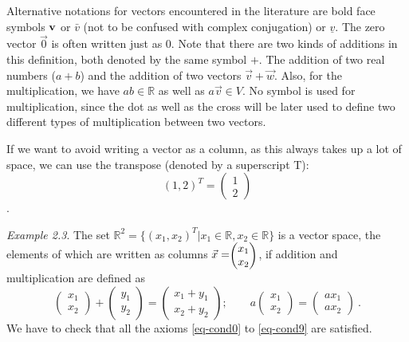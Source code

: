 \documentclass[
  letterpaper,
  DIV=11,
  numbers=noendperiod]{scrartcl}
\theoremstyle{remark}
\begin{document}
\begin{tcolorbox}[enhanced jigsaw, title=\textcolor{quarto-callout-note-color}{\faInfo}\hspace{0.5em}{Remark on Notation}, colframe=quarto-callout-note-color-frame, colbacktitle=quarto-callout-note-color!10!white, opacityback=0, bottomtitle=1mm, arc=.35mm, toptitle=1mm, colback=white, titlerule=0mm, bottomrule=.15mm, left=2mm, rightrule=.15mm, coltitle=black, toprule=.15mm, breakable, opacitybacktitle=0.6, leftrule=.75mm]

Alternative notations for vectors encountered in the literature are bold
face symbols \({\bf v}\) or \(\bar v\) (not to be confused with complex
conjugation) or \(\underline v\). The zero vector \(\vec{0}\) is often
written just as \(0\). Note that there are two kinds of additions in
this definition, both denoted by the same symbol \(+\). The addition of
two real numbers (\(a+b\)) and the addition of two vectors
\(\vec{v}+\vec{w}\). Also, for the multiplication, we have
\(ab \in \mathbb{R}\) as well as \(a \vec{v} \in V\). No symbol is used
for multiplication, since the dot as well as the cross will be later
used to define two different types of multiplication between two
vectors.

If we want to avoid writing a vector as a column, as this always takes
up a lot of space, we can use the transpose (denoted by a superscript
T): \[ (1,2)^T = \begin{pmatrix}  1 \\ 2 \end{pmatrix} \].

\end{tcolorbox}

\emph{Example 2.3}. The set
\(\mathbb{R}^2 = \{(x_{1},x_{2})^T \vert x_{1} \in \mathbb{R}, x_{2} \in \mathbb{R}\}\)
is a vector space, the elements of which are written as columns
\(\vec{x}=\scriptstyle \begin{pmatrix}   x_{1}\\x_{2}  \end{pmatrix} \textstyle\),
if addition and multiplication are defined as
\[ \begin{pmatrix}   x_1 \\ x_2  \end{pmatrix} 
  +
   \begin{pmatrix}   y_1 \\ y_2  \end{pmatrix} 
  =
   \begin{pmatrix}   x_1+y_1 \\ x_2+y_2  \end{pmatrix} ;
  \qquad
  a 
   \begin{pmatrix}   x_1 \\ x_2  \end{pmatrix} 
  =
   \begin{pmatrix}   a x_1 \\  a x_2  \end{pmatrix}  \ .\] We have to
check that all the axioms \ref{eq-cond0} to \ref{eq-cond9} are
satisfied.
\end{document}
